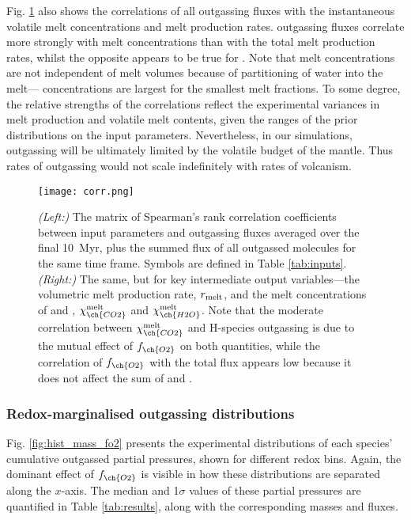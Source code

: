 Fig. \ref{fig:corr} also shows the correlations of all outgassing fluxes with the instantaneous volatile melt concentrations and melt production rates.  outgassing fluxes correlate more strongly with  melt concentrations than with the total melt production rates, whilst the opposite appears to be true for . Note that  melt concentrations are not independent of melt volumes because of partitioning of water into the melt--- concentrations are largest for the smallest melt fractions. To some degree, the relative strengths of the correlations reflect the experimental variances in melt production and volatile melt contents, given the ranges of the prior distributions on the input parameters. Nevertheless, in our simulations, outgassing will be ultimately limited by the volatile budget of the mantle. Thus rates of outgassing would not scale indefinitely with rates of volcanism.

\begin{figure}
\centering
  \texttt{[image: corr.png]}
\caption[Matrix of correlation coefficients between key parameters and outgassing fluxes.]{\textit{(Left:)} The matrix of Spearman's rank correlation coefficients between input parameters and outgassing fluxes averaged over the final 10~Myr, plus the summed flux of all outgassed molecules for the same time frame. Symbols are defined in Table \ref{tab:inputs}. \textit{(Right:)} The same, but for key intermediate output variables---the volumetric melt production rate, $r_{\rm melt}$, and the melt concentrations of  and , $\chi_{\ch{CO2}}^{\rm melt}$ and $\chi_{\ch{H2O}}^{\rm melt}$. Note that the moderate correlation between $\chi_{\ch{CO2}}^{\rm melt}$ and H-species outgassing is due to the mutual effect of $f_{\ch{O2}}$ on both quantities, while the correlation of $f_{\ch{O2}}$ with the total flux appears low because it does not affect the sum of  and .}\label{fig:corr}
\end{figure}



\subsubsection{Redox-marginalised outgassing distributions}



Fig. \ref{fig:hist_mass_fo2} presents the experimental distributions of each species' cumulative outgassed partial pressures, shown for different redox bins. Again, the dominant effect of $f_{\ch{O2}}$ is visible in how these distributions are separated along the $x$-axis. The median and 1$\sigma$ values of these partial pressures are quantified in Table \ref{tab:results}, along with the corresponding masses and fluxes.  



